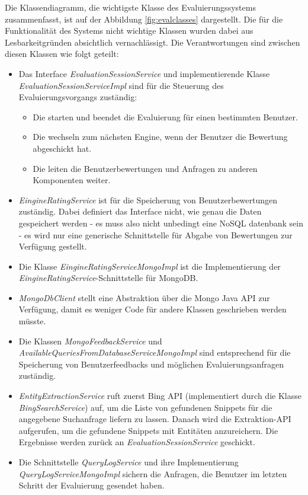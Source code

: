 Die Klassendiagramm, die wichtigste Klasse des Evaluierungssystems zusammenfasst, ist auf der Abbildung \ref{fig:evalclasses} dargestellt. Die für die Funktionalität des Systems nicht wichtige Klassen wurden dabei aus Lesbarkeitgründen absichtlich vernachlässigt. Die Verantwortungen sind zwischen diesen Klassen wie folgt geteilt:
\begin{itemize}
\item Das Interface \textit{EvaluationSessionService} und implementierende Klasse \textit{EvaluationSessionServiceImpl} sind für die Steuerung des Evaluierungsvorgangs zuständig:
\begin{itemize}
\item Die starten und beendet die Evaluierung für einen bestimmten Benutzer.
\item Die wechseln zum nächsten Engine, wenn der Benutzer die Bewertung abgeschickt hat.
\item Die leiten die Benutzerbewertungen und Anfragen zu anderen Komponenten weiter.
\end{itemize}
\item \textit{EingineRatingService} ist für die Speicherung von Benutzerbewertungen zuständig. Dabei definiert das Interface nicht, wie genau die Daten gespeichert werden - es muss also nicht unbedingt eine NoSQL datenbank sein - es wird nur eine generische Schnittstelle für Abgabe von Bewertungen zur Verfügung gestellt.
\item Die Klasse \textit{EingineRatingServiceMongoImpl} ist die Implementierung der \textit{EingineRatingService}-Schnittstelle für MongoDB.
\item \textit{MongoDbClient} stellt eine Abstraktion über die Mongo Java API zur Verfügung, damit es weniger Code für andere Klassen geschrieben werden müsste.
\item Die Klassen \textit{MongoFeedbackService} und \textit{AvailableQueriesFromDatabaseServiceMongoImpl} sind entsprechend für die Speicherung von Benutzerfeedbacks und möglichen Evaluierungsanfragen zuständig. 
\item \textit{EntityExtractionService} ruft zuerst Bing API (implementiert durch die Klasse \textit{BingSearchService}) auf, um die Liste von gefundenen Snippets für die angegebene Suchanfrage liefern zu lassen. Danach wird die Extraktion-API aufgerufen, um die gefundene Snippets mit Entitäten anzureichern. Die Ergebnisse werden zurück an \textit{EvaluationSessionService} geschickt.
\item Die Schnittstelle \textit{QueryLogService} und ihre Implementierung \textit{QueryLogServiceMongoImpl} sichern die Anfragen, die Benutzer im letzten Schritt der Evaluierung gesendet haben.
\end{itemize}

